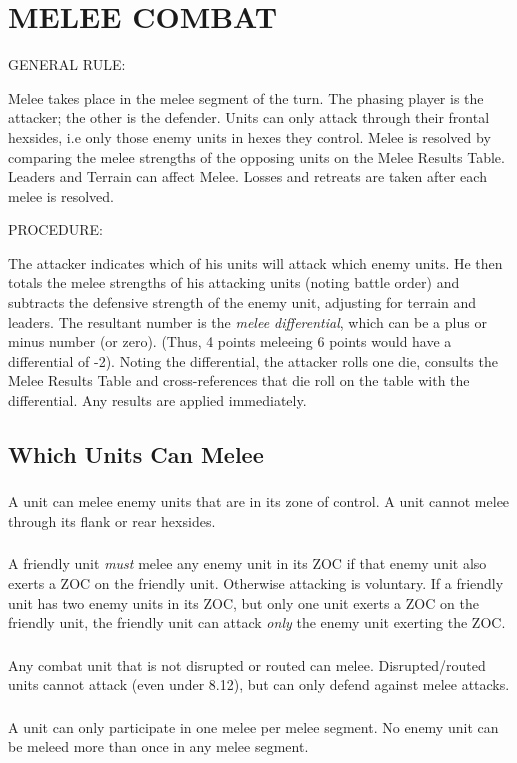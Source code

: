 \section{MELEE COMBAT}
\hfill

GENERAL RULE:

Melee takes place in the melee segment of the turn. The phasing player is the attacker; the other is the defender. Units can only attack through their frontal hexsides, i.e only those enemy units in hexes they control. Melee is resolved by comparing the melee strengths of the opposing units on the Melee Results Table. Leaders and Terrain can affect Melee. Losses and retreats are taken after each melee is resolved.

PROCEDURE:

The attacker indicates which of his units will attack which enemy units. He then totals the melee strengths of his attacking units (noting battle order) and subtracts the defensive strength of the enemy unit, adjusting for terrain and leaders. The resultant number is the \textit{melee differential}, which can be a plus or minus number (or zero). (Thus, 4 points meleeing 6 points would have a differential of -2). Noting the differential, the attacker rolls one die, consults the Melee Results Table and cross-references that die roll on the table with the differential. Any results are applied immediately.

\subsection{Which Units Can Melee}

\subsubsection[ZoC]{} A unit can melee enemy units that are in its zone of control. A unit cannot melee through its flank or rear hexsides.

\subsubsection[Mandatory Attacks]{} A friendly unit \textit{must} melee any enemy unit in its ZOC if that enemy unit also exerts a ZOC on the friendly unit. Otherwise attacking is voluntary. If a friendly unit has two enemy units in its ZOC, but only one unit exerts a ZOC on the friendly unit, the friendly unit can attack \textit{only} the enemy unit exerting the ZOC.

\subsubsection[Disrupted Units]{} Any combat unit that is not disrupted or routed can melee. Disrupted/routed units cannot attack (even under 8.12), but can only defend against melee attacks.

\subsubsection[Only One Melee]{} A unit can only participate in one melee per melee segment. No enemy unit can be meleed more than once in any melee segment.